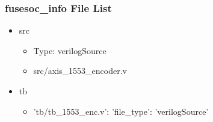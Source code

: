 \subsubsection{fusesoc\_info File List}
\begin{itemize}
\item src
	\begin{itemize}
	\item[$\space$] Type: verilogSource
	\item src/axis\_1553\_encoder.v
	\end{itemize}
\item tb
	\begin{itemize}
	\item {'tb/tb\_1553\_enc.v': {'file\_type': 'verilogSource'}}
	\end{itemize}
\end{itemize}
